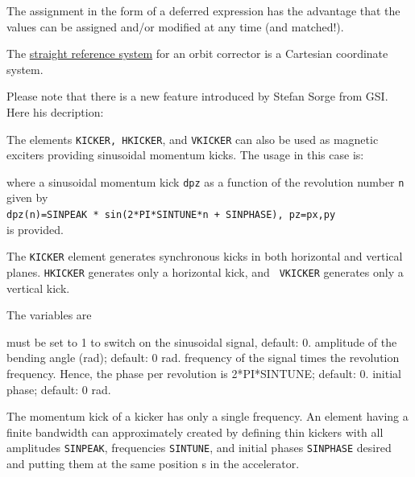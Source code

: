 The assignment in the form of a deferred expression has the advantage
that the values can be assigned and/or modified at any time (and
matched!).   

The \hyperref[subsec:local_straight]{straight reference system} for an
orbit corrector is a Cartesian coordinate system.  


Please note that there is a new feature introduced by Stefan Sorge from
GSI. Here his decription:

The elements {\tt KICKER, HKICKER}, and {\tt VKICKER} can also be used as 
magnetic exciters providing sinusoidal momentum kicks. The usage in this case 
is:

where a sinusoidal momentum kick {\tt dpz} as a function of the  revolution
number {\tt n} given by\\   
{\tt dpz(n)=SINPEAK * sin(2*PI*SINTUNE*n + SINPHASE), pz=px,py} \\ 
is provided. 

The {\tt KICKER} element generates synchronous kicks in both horizontal and
vertical planes. {\tt HKICKER} generates only a horizontal kick, and {\tt 
VKICKER} generates only a vertical kick.   

The variables are 

\begin{madlist}
    must be set to 1 to switch on the sinusoidal
     signal, default: 0.  
    amplitude of the bending angle (rad); default: 0
     rad.   
    frequency of the signal times the revolution
     frequency.  Hence, the phase per revolution is 2*PI*SINTUNE;
     default: 0.   
    initial phase; default: 0 rad.  
\end{madlist}

The momentum kick of a kicker has only a single frequency. An element
having a finite bandwidth can approximately created by defining  thin
kickers with all amplitudes {\tt SINPEAK}, frequencies {\tt SINTUNE}, and  
initial phases {\tt SINPHASE} desired and putting them at the same position s 
in  the accelerator.   



